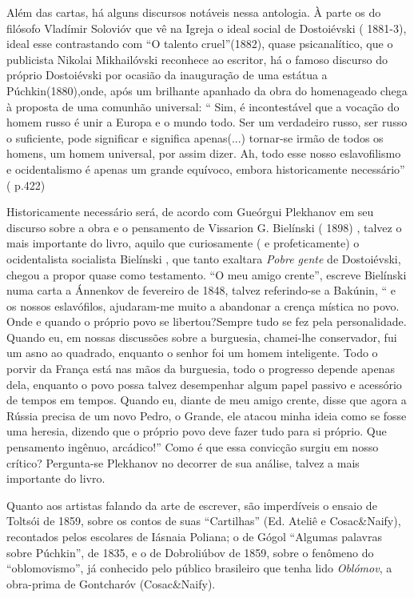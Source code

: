 Além das cartas, há alguns discursos notáveis nessa antologia. À parte
os do filósofo Vladímir Solovióv que vê na Igreja o ideal social de
Dostoiévski ( 1881-3), ideal esse contrastando com ``O talento
cruel''(1882), quase psicanalítico, que o publicista Nikolai
Mikhailóvski reconhece ao escritor, há o famoso discurso do próprio
Dostoiévski por ocasião da inauguração de uma estátua a
Púchkin(1880),onde, após um brilhante apanhado da obra do homenageado
chega à proposta de uma comunhão universal: `` Sim, é incontestável que
a vocação do homem russo é unir a Europa e o mundo todo. Ser um
verdadeiro russo, ser russo o suficiente, pode significar e significa
apenas(...) tornar-se irmão de todos os homens, um homem universal, por
assim dizer. Ah, todo esse nosso eslavofilismo e ocidentalismo é apenas
um grande equívoco, embora historicamente necessário'' ( p.422)

Historicamente necessário será, de acordo com Gueórgui Plekhanov em seu
discurso sobre a obra e o pensamento de Vissarion G. Bielínski ( 1898) ,
talvez o mais importante do livro, aquilo que curiosamente ( e
profeticamente) o ocidentalista socialista Bielínski , que tanto
exaltara \emph{Pobre gente} de Dostoiévski, chegou a propor quase como
testamento. ``O meu amigo crente'', escreve Bielínski numa carta a
Ánnenkov de fevereiro de 1848, talvez referindo-se a Bakúnin, `` e os
nossos eslavófilos, ajudaram-me muito a abandonar a crença mística no
povo. Onde e quando o próprio povo se libertou?Sempre tudo se fez pela
personalidade. Quando eu, em nossas discussões sobre a burguesia,
chamei-lhe conservador, fui um asno ao quadrado, enquanto o senhor foi
um homem inteligente. Todo o porvir da França está nas mãos da
burguesia, todo o progresso depende apenas dela, enquanto o povo possa
talvez desempenhar algum papel passivo e acessório de tempos em tempos.
Quando eu, diante de meu amigo crente, disse que agora a Rússia precisa
de um novo Pedro, o Grande, ele atacou minha ideia como se fosse uma
heresia, dizendo que o próprio povo deve fazer tudo para si próprio. Que
pensamento ingênuo, arcádico!'' Como é que essa convicção surgiu em
nosso crítico? Pergunta-se Plekhanov no decorrer de sua análise, talvez
a mais importante do livro.

Quanto aos artistas falando da arte de escrever, são imperdíveis o
ensaio de Toltsói de 1859, sobre os contos de suas ``Cartilhas'' (Ed.
Ateliê e Cosac\&Naify), recontados pelos escolares de Iásnaia Poliana; o
de Gógol ``Algumas palavras sobre Púchkin'', de 1835, e o de Dobroliúbov
de 1859, sobre o fenômeno do ``oblomovismo'', já conhecido pelo público
brasileiro que tenha lido \emph{Oblómov}, a obra-prima de Gontcharóv
(Cosac\&Naify).

